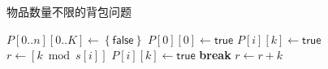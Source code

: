 \begin{questions}
\begin{solution}
        \begin{algorithm}[H]
            \caption{物品数量不限的背包问题}
            \begin{algorithmic}[1]
                \State $P[0..n][0..K] \gets \left\{ \mathsf{false} \right\}$
                \State $P[0][0] \gets \mathsf{true}$
                \State $P[i][k] \gets \mathsf{true}$
                \Else
                \State $r \gets \left[ k \bmod s[i] \right]$
                \State $P[i][k] \gets \mathsf{true}$
                \State \textbf{break}
                \EndIf
                \State $r \gets r + k$
                \EndWhile
                \EndIf
                \EndFor
                \EndFor
            \end{algorithmic}
        \end{algorithm}

    \end{solution}

\end{questions}
